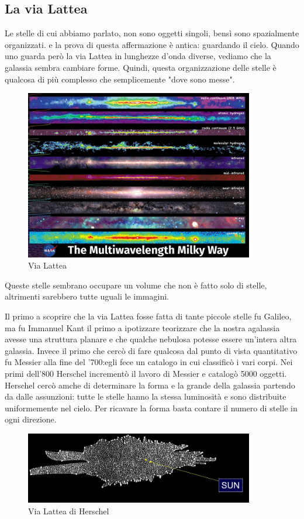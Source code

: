 \documentclass[a4paper,11pt]{article}
\begin{document}
\subsection{La via Lattea}
Le stelle di cui abbiamo parlato, non sono oggetti singoli, bensì sono spazialmente organizzati. e la prova di questa affermazione è antica: guardando il cielo. Quando uno guarda però la via Lattea in lunghezze d'onda diverse, vediamo che la galassia sembra cambiare forme. Quindi, questa organizzazione delle stelle è qualcosa di più complesso che semplicemente "dove sono messe".

\begin{figure}[h!!]
        \centering
        \includegraphics[width=10cm]{Via Lattea.JPG}
        \caption{Via Lattea}
        \label{fig:Correnti parassite}
    \end{figure}

Queste stelle sembrano occupare un volume che non è fatto solo di stelle, altrimenti sarebbero tutte uguali le immagini. 

Il primo a scoprire che la via Lattea fosse fatta di tante piccole stelle fu Galileo, ma fu Immanuel Kant il primo a ipotizzare teorizzare che la nostra agalassia avesse una struttura planare e che qualche nebulosa potesse essere un'intera altra galassia. Invece il primo che cercò di fare qualcosa dal punto di vista quantitativo fu Messier alla fine del '700:egli fece un catalogo in cui classificò i vari corpi. Nei primi dell'800 Herschel incrementò il lavoro di Messier e catalogò 5000 oggetti. Herschel cercò amche di determinare la forma e la grande della galassia partendo da dalle assunzioni: tutte le stelle hanno la stessa luminosità e sono distribuite uniformemente nel cielo. Per ricavare la forma basta contare il numero di stelle in ogni direzione.
\begin{figure}[h!!]
        \centering
        \includegraphics[width=10cm]{Via Lattea di Herschel.JPG}
        \caption{Via Lattea di Herschel}
        \label{fig:Correnti parassite}
    \end{figure}
\end{document}

